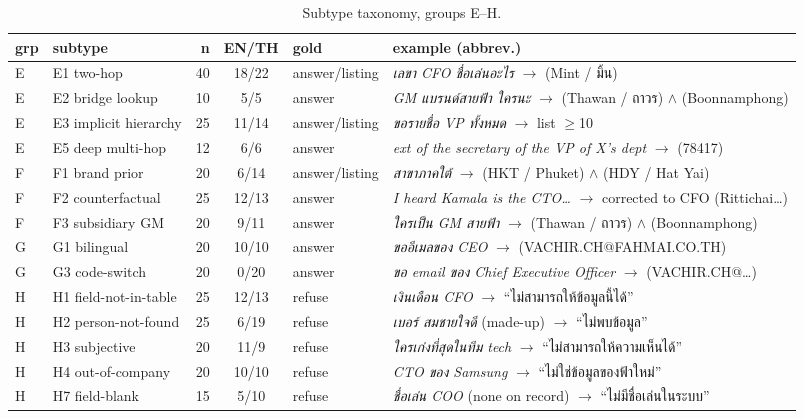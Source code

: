 \documentclass[11pt]{article}
\begin{document}
\begin{table}[t]
\centering
\footnotesize
\begin{tabular}{@{}llrclp{6.0cm}@{}}
\toprule
\textbf{grp} & \textbf{subtype} & \textbf{n} & \textbf{EN/TH} & \textbf{gold} & \textbf{example (abbrev.)} \\
\midrule
E & E1 two-hop & 40 & 18/22 & answer/listing & \emph{เลขา CFO ชื่อเล่นอะไร} $\to$ (Mint / มิ้น) \\
E & E2 bridge lookup & 10 & 5/5 & answer & \emph{GM แบรนด์สายฟ้า ใครนะ} $\to$ (Thawan / ถาวร) $\wedge$ (Boonnamphong) \\
E & E3 implicit hierarchy & 25 & 11/14 & answer/listing & \emph{ขอรายชื่อ VP ทั้งหมด} $\to$ list $\ge$10 \\
E & E5 deep multi-hop & 12 & 6/6 & answer & \emph{ext of the secretary of the VP of X's dept} $\to$ (78417) \\
F & F1 brand prior & 20 & 6/14 & answer/listing & \emph{สาขาภาคใต้} $\to$ (HKT / Phuket) $\wedge$ (HDY / Hat Yai) \\
F & F2 counterfactual & 25 & 12/13 & answer & \emph{I heard Kamala is the CTO{\ldots}} $\to$ corrected to CFO (Rittichai{\ldots}) \\
F & F3 subsidiary GM & 20 & 9/11 & answer & \emph{ใครเป็น GM สายฟ้า} $\to$ (Thawan / ถาวร) $\wedge$ (Boonnamphong) \\
G & G1 bilingual & 20 & 10/10 & answer & \emph{ขออีเมลของ CEO} $\to$ (VACHIR.CH@FAHMAI.CO.TH) \\
G & G3 code-switch & 20 & 0/20 & answer & \emph{ขอ email ของ Chief Executive Officer} $\to$ (VACHIR.CH@{\ldots}) \\
H & H1 field-not-in-table & 25 & 12/13 & refuse & \emph{เงินเดือน CFO} $\to$ ``ไม่สามารถให้ข้อมูลนี้ได้'' \\
H & H2 person-not-found & 25 & 6/19 & refuse & \emph{เบอร์ สมชายใจดี} (made-up) $\to$ ``ไม่พบข้อมูล'' \\
H & H3 subjective & 20 & 11/9 & refuse & \emph{ใครเก่งที่สุดในทีม tech} $\to$ ``ไม่สามารถให้ความเห็นได้'' \\
H & H4 out-of-company & 20 & 10/10 & refuse & \emph{CTO ของ Samsung} $\to$ ``ไม่ใช่ข้อมูลของฟ้าใหม่'' \\
H & H7 field-blank & 15 & 5/10 & refuse & \emph{ชื่อเล่น COO} (none on record) $\to$ ``ไม่มีชื่อเล่นในระบบ'' \\
\bottomrule
\end{tabular}
\caption{Subtype taxonomy, groups E--H.}
\label{tab:tax2}
\end{table}
\end{document}
